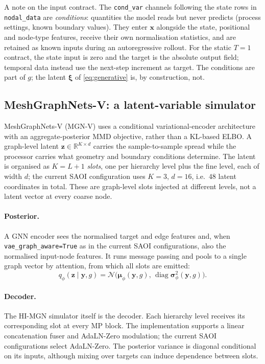 A note on the input contract. The \texttt{cond\_var} channels following the
state rows in \texttt{nodal\_data} are
\emph{conditions}: quantities the model reads but never predicts (process
settings, known boundary values). They enter $\mathbf{x}$ alongside the state,
positional and node-type features, receive their own normalisation statistics,
and are retained as known inputs during an autoregressive rollout. For the
static $T=1$ contract, the state input is zero and the target is the absolute
output field; temporal data instead use the next-step increment as target.
The conditions are part of $g$; the latent $\boldsymbol{\xi}$ of
\eqref{eq:generative} is, by construction, not.

\subsection{MeshGraphNets-V: a latent-variable simulator}
\label{sec:method:mgnv}

MeshGraphNets-V (MGN-V) uses a conditional variational-encoder architecture
with an aggregate-posterior MMD objective, rather than a KL-based ELBO. A graph-level latent
$\mathbf{z}\in\mathbb{R}^{K\times d}$ carries the sample-to-sample spread while
the processor carries what geometry and boundary conditions determine. The
latent is organised as $K=L+1$ \emph{slots}, one per hierarchy level plus the
fine level, each of width $d$; the current SAOI configuration uses
$K=3$, $d=16$, i.e.\ $48$ latent coordinates in total. These are graph-level
slots injected at different levels, not a latent vector at every coarse node.

\paragraph{Posterior.}
A GNN encoder sees the normalised target and edge features and, when
\texttt{vae\_graph\_aware=True} as in the current SAOI configurations, also
the normalised input-node features. It runs message passing and
pools to a single graph vector by attention, from which all slots are emitted:
\begin{equation}
  q_\phi(\mathbf{z}\mid \mathbf{y},g)
  = \mathcal{N}\bigl(\boldsymbol{\mu}_\phi(\mathbf{y},g),\,
                     \operatorname{diag}\boldsymbol{\sigma}^2_\phi(\mathbf{y},g)\bigr).
  \label{eq:posterior}
\end{equation}

\paragraph{Decoder.}
The HI-MGN simulator itself is the decoder. Each hierarchy level receives its
corresponding slot at every MP block. The implementation supports a linear
concatenation fuser and AdaLN-Zero modulation; the current SAOI configurations
select AdaLN-Zero. The posterior variance is diagonal conditional on its
inputs, although mixing over targets can induce dependence between slots.

